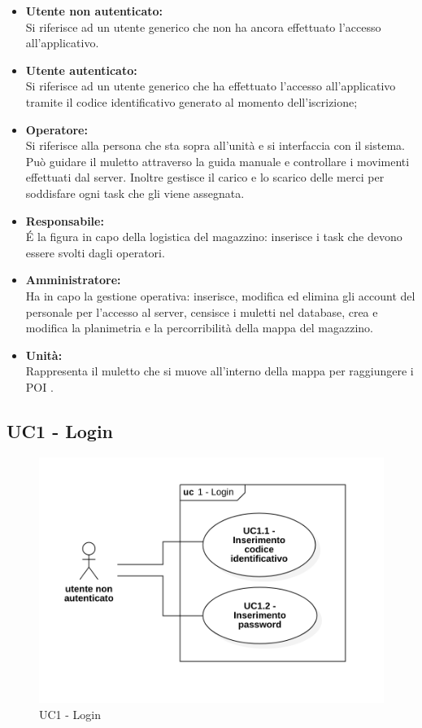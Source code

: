 \begin{itemize}
	\item{\textbf{Utente non autenticato:}\\
	Si riferisce ad un utente generico che non ha ancora effettuato l'accesso all'applicativo.}
	\item{\textbf{Utente autenticato:}\\
	Si riferisce ad un utente generico che ha effettuato l'accesso all'applicativo tramite il codice identificativo generato al momento dell'iscrizione;}
	\item{\textbf{Operatore:}\\
	Si riferisce alla persona che sta sopra all'unità e si interfaccia con il sistema. Può guidare il muletto attraverso la guida manuale e controllare i movimenti effettuati dal server. Inoltre gestisce il carico e lo scarico delle merci per soddisfare ogni task che gli viene assegnata.}
	\item{\textbf{Responsabile:}\\
	 \'E la figura in capo della logistica del magazzino: inserisce i task che devono essere svolti dagli operatori.}
	\item{\textbf{Amministratore:}\\
 Ha in capo la gestione operativa: inserisce, modifica ed elimina gli account del personale per l'accesso al server, censisce i muletti nel database, crea e modifica la planimetria e la percorribilità della mappa del magazzino.}
	\item {\textbf{Unità:}\\
	Rappresenta il muletto che si muove all'interno della mappa per raggiungere i POI . }
\end{itemize}

\subsection{UC1 - Login}
\begin{figure}[H]
	\centering
	\includegraphics[scale=0.6]{res/images/uc1.PNG}
	\caption{UC1 - Login}
\end{figure}



